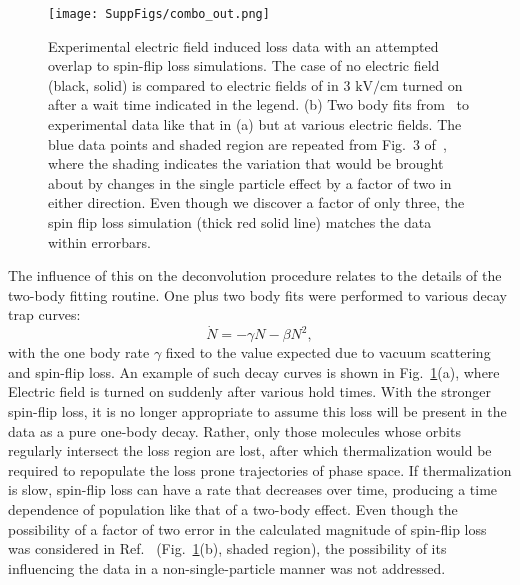 \documentclass[%
 reprint,
 amsmath,amssymb,
 aps,
pra,
]{revtex4-1}
\begin{document}
\begin{figure} %
\texttt{[image: SuppFigs/combo\_out.png]} 
\caption{Experimental electric field induced loss data with an attempted overlap to spin-flip loss simulations. The case of no electric field (black, solid) is compared to electric fields of in $3\text{ kV/cm}$ turned on after a wait time indicated in the legend. (b) Two body fits from~\cite{Stuhl2013} to experimental data like that in (a) but at various electric fields. The blue data points and shaded region are repeated from Fig.~3 of~\cite{Stuhl2013}, where the shading indicates the variation that would be brought about by changes in the single particle effect by a factor of two in either direction. Even though we discover a factor of only three, the spin flip loss simulation (thick red solid line) matches the data within errorbars.\label{fig:eil}}
\end{figure}

The influence of this on the deconvolution procedure relates to the details of the two-body fitting routine.
One plus two body fits were performed to various decay trap curves:
\begin{equation}
\dot{N}=-\gamma N-\beta N^2,
\end{equation}
with the one body rate $\gamma$ fixed to the value expected due to vacuum scattering and spin-flip loss.
An example of such decay curves is shown in Fig.~\ref{fig:eil}(a), where Electric field is turned on suddenly after various hold times.
With the stronger spin-flip loss, it is no longer appropriate to assume this loss will be present in the data as a pure one-body decay.
Rather, only those molecules whose orbits regularly intersect the loss region are lost, after which thermalization would be required to repopulate the loss prone trajectories of phase space.
If thermalization is slow, spin-flip loss can have a rate that decreases over time, producing a time dependence of population like that of a two-body effect.
Even though the possibility of a factor of two error in the calculated magnitude of spin-flip loss was considered in Ref.~\cite{Stuhl2013} (Fig.~\ref{fig:eil}(b), shaded region), the possibility of its influencing the data in a non-single-particle manner was not addressed.
\end{document}
